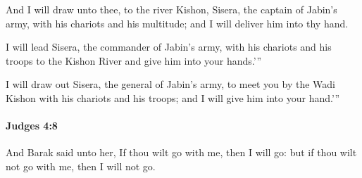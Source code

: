 			\begin{versebox}
					\item[BHS] 
					\item[ASV] And I will draw unto thee, to the river Kishon, Sisera, the captain of Jabin's army, with his chariots and his multitude; and I will deliver him into thy hand.
					\item[NIV] I will lead Sisera, the commander of Jabin’s army, with his chariots and his troops to the Kishon River and give him into your hands.’”
					\item[NRSV] I will draw out Sisera, the general of Jabin’s army, to meet you by the Wadi Kishon with his chariots and his troops; and I will give him into your hand.’”
			\end{versebox}

		\paragraph{Judges 4:8} %
			\label{JUDGES-4-8}

			And Barak said unto her, If thou wilt go with me, then I will go: but if thou wilt not go with me, then I will not go.

